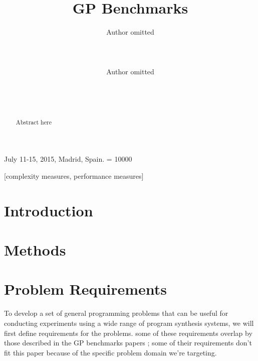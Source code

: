 \documentclass{sig-alternate}
\begin{document}
%
 {July 11-15, 2015, Madrid, Spain.}
\widowpenalty = 10000

\title{GP Benchmarks}


\author{
\alignauthor
Author omitted\\
       \\
       \\
       \\
\alignauthor
Author omitted\\
       \\
       \\
       \\
}

\maketitle

\begin{abstract}
Abstract here
\end{abstract}

[complexity measures, performance measures]



\section{Introduction}



\section{Methods}


\section{Problem Requirements} \label{requirements}

To develop a set of general programming problems that can be useful for conducting experiments using a wide range of program synthesis systems, we will first define requirements for the problems. some of these requirements overlap by those described in the GP benchmarks papers \cite{McDermott:2012:GECCO, White:2013:BGB:2441218.2441242}; some of their requirements don't fit this paper because of the specific problem domain we're targeting.
\end{document}
